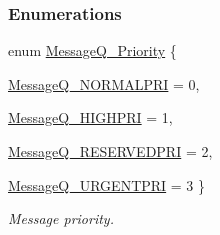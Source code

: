 \subsubsection*{Enumerations}
\begin{DoxyCompactItemize}
\item 
enum \hyperlink{_message_q_8h_a01e825f1f15fa12643eabea99ca76248}{MessageQ\_\-Priority} \{ \par
\hyperlink{_message_q_8h_a01e825f1f15fa12643eabea99ca76248a12365e9d70b3fc967dc147e2f8a0d4fb}{MessageQ\_\-NORMALPRI} =  0, 
\par
\hyperlink{_message_q_8h_a01e825f1f15fa12643eabea99ca76248ae06ba6f7cd0cafb89a56b1224693755d}{MessageQ\_\-HIGHPRI} =  1, 
\par
\hyperlink{_message_q_8h_a01e825f1f15fa12643eabea99ca76248a3baaafcfd52556f649576a8c08748d03}{MessageQ\_\-RESERVEDPRI} =  2, 
\par
\hyperlink{_message_q_8h_a01e825f1f15fa12643eabea99ca76248a18496bc5d4650cd4eb8db0c399d95399}{MessageQ\_\-URGENTPRI} =  3
 \}
\begin{DoxyCompactList}\small\item\em Message priority. \item\end{DoxyCompactList}\end{DoxyCompactItemize}
